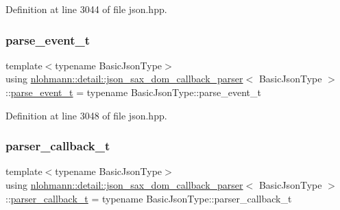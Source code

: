 Definition at line 3044 of file json.\+hpp.

\mbox{\label{classnlohmann_1_1detail_1_1json__sax__dom__callback__parser_aac6d706967b2ecc2510e172577d8550b}} 
\subsubsection{\texorpdfstring{parse\_event\_t}{parse\_event\_t}}
{\footnotesize\ttfamily template$<$typename Basic\+Json\+Type$>$ \\
using \mbox{\hyperlink{classnlohmann_1_1detail_1_1json__sax__dom__callback__parser}{nlohmann\+::detail\+::json\+\_\+sax\+\_\+dom\+\_\+callback\+\_\+parser}}$<$ Basic\+Json\+Type $>$\+::\mbox{\hyperlink{classnlohmann_1_1detail_1_1json__sax__dom__callback__parser_aac6d706967b2ecc2510e172577d8550b}{parse\+\_\+event\+\_\+t}} =  typename Basic\+Json\+Type\+::parse\+\_\+event\+\_\+t}



Definition at line 3048 of file json.\+hpp.

\mbox{\label{classnlohmann_1_1detail_1_1json__sax__dom__callback__parser_a4f636086fa8e7cf26c35c8afd50903ce}} 
\subsubsection{\texorpdfstring{parser\_callback\_t}{parser\_callback\_t}}
{\footnotesize\ttfamily template$<$typename Basic\+Json\+Type$>$ \\
using \mbox{\hyperlink{classnlohmann_1_1detail_1_1json__sax__dom__callback__parser}{nlohmann\+::detail\+::json\+\_\+sax\+\_\+dom\+\_\+callback\+\_\+parser}}$<$ Basic\+Json\+Type $>$\+::\mbox{\hyperlink{classnlohmann_1_1detail_1_1json__sax__dom__callback__parser_a4f636086fa8e7cf26c35c8afd50903ce}{parser\+\_\+callback\+\_\+t}} =  typename Basic\+Json\+Type\+::parser\+\_\+callback\+\_\+t}



